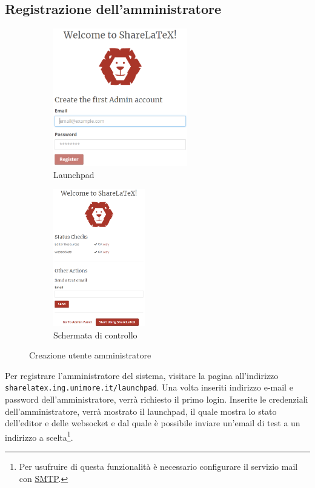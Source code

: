 \subsection{Registrazione dell'amministratore}
\begin{figure}[h]
    \begin{subfigure}{0.5\textwidth}
        \centering
        \includegraphics[height=6cm]{immagini/launchpad_1.png}
        \caption{Launchpad}
        \label{fig:sharelatex_launchpad_1}
    \end{subfigure}
    \begin{subfigure}{0.5\textwidth}
        \centering
        \includegraphics[height=6cm]{immagini/launchpad_2.png}
        \caption{Schermata di controllo}
        \label{fig:sharelatex_launchpad_2}
    \end{subfigure}
    \caption{Creazione utente amministratore}
    \label{fig:sharelatex_launchpad}
\end{figure}
\noindent Per registrare l'amministratore del sistema, visitare la pagina all'indirizzo\\\verb|sharelatex.ing.unimore.it/launchpad|. Una volta inseriti indirizzo e-mail e password dell'amministratore, verrà richiesto il primo login. Inserite le credenziali dell'amministratore, verrà mostrato il launchpad, il quale mostra lo stato dell'editor e delle websocket e dal quale è possibile inviare un'email di test a un indirizzo a scelta\footnote{Per usufruire di questa funzionalità è necessario configurare il servizio mail con \hyperref[SMTP]{SMTP}.}.

